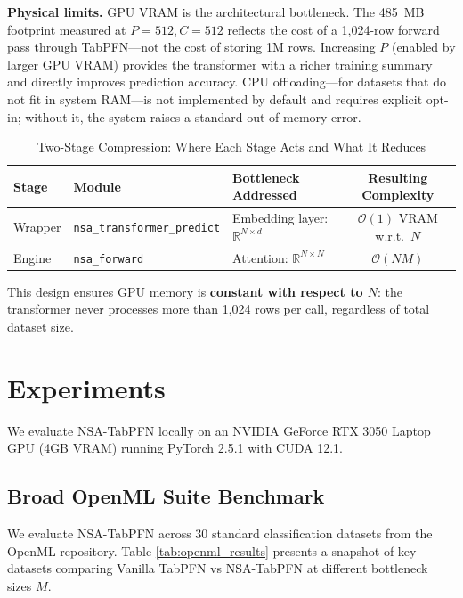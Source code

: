 \documentclass{article} %
\begin{document}
\textbf{Physical limits.} GPU VRAM is the architectural bottleneck. The 485~MB footprint measured at $P=512, C=512$ reflects the cost of a 1,024-row forward pass through TabPFN---not the cost of storing 1M rows. Increasing $P$ (enabled by larger GPU VRAM) provides the transformer with a richer training summary and directly improves prediction accuracy. CPU offloading---for datasets that do not fit in system RAM---is not implemented by default and requires explicit opt-in; without it, the system raises a standard out-of-memory error.

\begin{table}[h]
\centering
\caption{Two-Stage Compression: Where Each Stage Acts and What It Reduces}
\label{tab:two_stage}
\begin{tabular}{lllc}
\toprule
Stage & Module & Bottleneck Addressed & Resulting Complexity \\
\midrule
Wrapper & \texttt{nsa\_transformer\_predict} & Embedding layer: $\mathbb{R}^{N \times d}$ & $\mathcal{O}(1)$ VRAM w.r.t.\ $N$ \\
Engine  & \texttt{nsa\_forward} & Attention: $\mathbb{R}^{N \times N}$ & $\mathcal{O}(NM)$ \\
\bottomrule
\end{tabular}
\end{table}

This design ensures GPU memory is \textbf{constant with respect to $N$}: the transformer never processes more than 1,024 rows per call, regardless of total dataset size.

\section{Experiments}

We evaluate NSA-TabPFN locally on an NVIDIA GeForce RTX 3050 Laptop GPU (4GB VRAM) running PyTorch 2.5.1 with CUDA 12.1. 

\subsection{Broad OpenML Suite Benchmark}

We evaluate NSA-TabPFN across 30 standard classification datasets from the OpenML repository. Table \ref{tab:openml_results} presents a snapshot of key datasets comparing Vanilla TabPFN vs NSA-TabPFN at different bottleneck sizes $M$.
\end{document}
